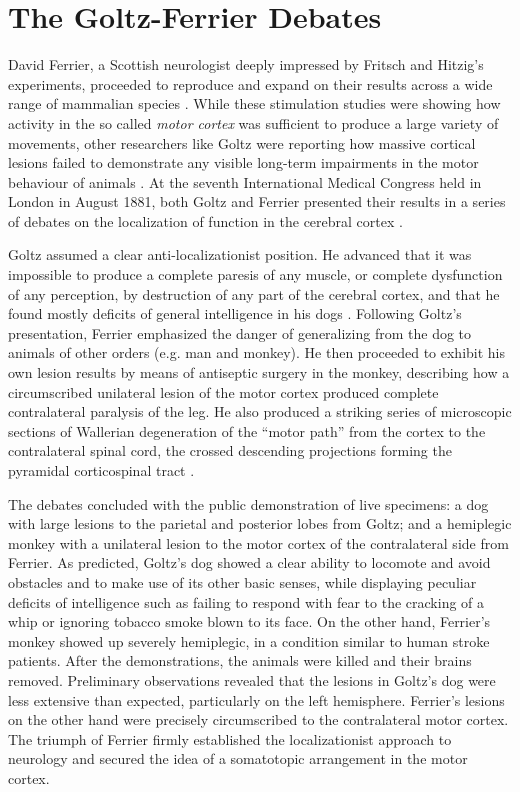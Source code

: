 \section{The Goltz-Ferrier Debates}

David Ferrier, a Scottish neurologist deeply impressed by Fritsch and Hitzig's experiments, proceeded to reproduce and expand on their results across a wide range of mammalian species \cite{Ferrier1873}. While these stimulation studies were showing how activity in the so called \emph{motor cortex} was sufficient to produce a large variety of movements, other researchers like Goltz were reporting how massive cortical lesions failed to demonstrate any visible long-term impairments in the motor behaviour of animals \cite{Goltz1888}. At the seventh International Medical Congress held in London in August 1881, both Goltz and Ferrier presented their results in a series of debates on the localization of function in the cerebral cortex \cite{Tyler2000}.

Goltz assumed a clear anti-localizationist position. He advanced that it was impossible to produce a complete paresis of any muscle, or complete dysfunction of any perception, by destruction of any part of the cerebral cortex, and that he found mostly deficits of general intelligence in his dogs \cite{Tyler2000}. Following Goltz's presentation, Ferrier emphasized the danger of generalizing from the dog to animals of other orders (e.g. man and monkey). He then proceeded to exhibit his own lesion results by means of antiseptic surgery in the monkey, describing how a circumscribed unilateral lesion of the motor cortex produced complete contralateral paralysis of the leg. He also produced a striking series of microscopic sections of Wallerian degeneration of the ``motor path'' from the cortex to the contralateral spinal cord, the crossed descending projections forming the pyramidal corticospinal tract \cite{Tyler2000}.

The debates concluded with the public demonstration of live specimens: a dog with large lesions to the parietal and posterior lobes from Goltz; and a hemiplegic monkey with a unilateral lesion to the motor cortex of the contralateral side from Ferrier. As predicted, Goltz's dog showed a clear ability to locomote and avoid obstacles and to make use of its other basic senses, while displaying peculiar deficits of intelligence such as failing to respond with fear to the cracking of a whip or ignoring tobacco smoke blown to its face. On the other hand, Ferrier's monkey showed up severely hemiplegic, in a condition similar to human stroke patients. After the demonstrations, the animals were killed and their brains removed. Preliminary observations revealed that the lesions in Goltz's dog were less extensive than expected, particularly on the left hemisphere. Ferrier's lesions on the other hand were precisely circumscribed to the contralateral motor cortex. The triumph of Ferrier firmly established the localizationist approach to neurology and secured the idea of a somatotopic arrangement in the motor cortex.

